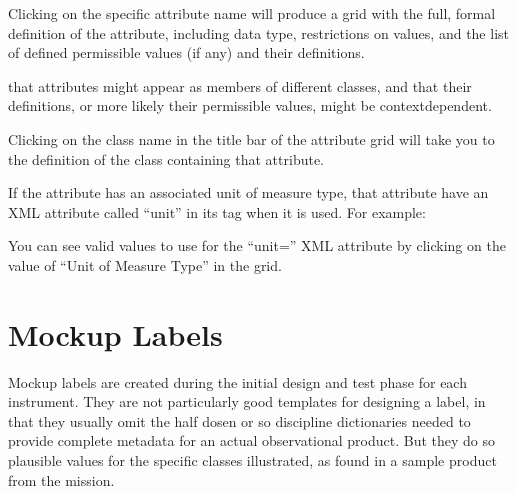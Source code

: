 \documentclass[letterpaper,10pt,english]{sphinxmanual}
\begin{document}
\sphinxAtStartPar
Clicking on the specific attribute name will produce a grid with the full, formal
definition of the attribute, including data type, restrictions on values, and the
list of defined permissible values (if any) and their definitions.

\sphinxAtStartPar
{} that attributes might appear as members of different classes, and that their
definitions, or more likely their permissible values, might be context\sphinxhyphen{}dependent.

\sphinxAtStartPar
Clicking on the class name in the title bar of the attribute grid will take you to
the definition of the class containing that attribute.

\sphinxAtStartPar
If the attribute has an associated unit of measure type, that attribute  have
an XML attribute called “unit” in its tag when it is used. For example:

\begin{sphinxVerbatim}[commandchars=\\\{\}]
 
\end{sphinxVerbatim}

\sphinxAtStartPar
You can see valid values to use for the “unit=” XML attribute by clicking on the
value of “Unit of Measure Type” in the grid.

\sphinxstepscope


\chapter{Mockup Labels}
\label{\detokenize{examples/examples:mockup-labels}}\label{\detokenize{examples/examples::doc}}
\sphinxAtStartPar
Mockup labels are created during the initial design and test phase for
each instrument. They are not particularly good templates for designing
a  label, in that they usually omit the half dosen or so discipline
dictionaries needed to provide complete metadata for an actual observational
product. But they do so plausible values for the specific classes illustrated,
as found in a sample product from the mission.
\end{document}
